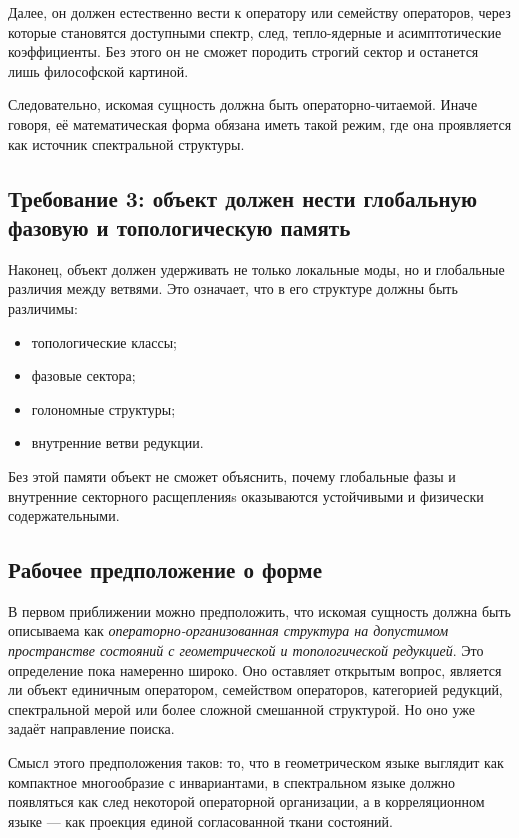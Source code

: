 \documentclass[12pt,a4paper]{article}
\begin{document}
Далее, он должен естественно вести к оператору или семейству операторов, через которые становятся доступными спектр, след, тепло-ядерные и асимптотические коэффициенты. Без этого он не сможет породить строгий сектор и останется лишь философской картиной.

Следовательно, искомая сущность должна быть операторно-читаемой. Иначе говоря, её математическая форма обязана иметь такой режим, где она проявляется как источник спектральной структуры.

\subsection{Требование 3: объект должен нести глобальную фазовую и топологическую память}

Наконец, объект должен удерживать не только локальные моды, но и глобальные различия между ветвями. Это означает, что в его структуре должны быть различимы:
\begin{itemize}
    \item топологические классы;
    \item фазовые сектора;
    \item голономные структуры;
    \item внутренние ветви редукции.
\end{itemize}

Без этой памяти объект не сможет объяснить, почему глобальные фазы и внутренние секторного расщепленияs оказываются устойчивыми и физически содержательными.

\subsection{Рабочее предположение о форме}

В первом приближении можно предположить, что искомая сущность должна быть описываема как \textit{операторно-организованная структура на допустимом пространстве состояний с геометрической и топологической редукцией}. Это определение пока намеренно широко. Оно оставляет открытым вопрос, является ли объект единичным оператором, семейством операторов, категорией редукций, спектральной мерой или более сложной смешанной структурой. Но оно уже задаёт направление поиска.

Смысл этого предположения таков: то, что в геометрическом языке выглядит как компактное многообразие с инвариантами, в спектральном языке должно появляться как след некоторой операторной организации, а в корреляционном языке --- как проекция единой согласованной ткани состояний.
\end{document}
